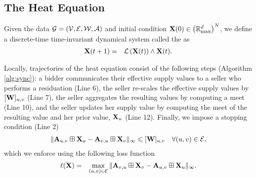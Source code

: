\documentclass[letterpaper, 10 pt, conference]{ieeeconf}
\begin{document}
\subsection{The Heat Equation}
\label{sec:heat}

Given the data $\mathcal{G} = (\mathcal{V},\mathcal{E},\mathcal{W},\mathcal{A})$ and initial condition $\mathbf{X}(0) \in \left(\mathbb{R}_{\mathrm{max}}^{d}\right)^N$, we define a discrete-time time-invariant dynamical system called the  as
\begin{align} 
    \mathbf{X}(t+1) &=& \mathcal{L} \left( \mathbf{X}(t) \right) \wedge \mathbf{X}(t). \label{eq:heat}
\end{align}

Locally, trajectories of the heat equation consist of the following steps (Algorithm \ref{alg:sync}): a bidder communicates their effective supply values to a seller who performs a residuation (Line 6), the seller re-scales the effective supply values by $[\mathbf{W}]_{u,v}$ (Line 7), the seller aggregates the resulting values by computing a meet (Line 10), and the seller updates her supply value by computing the meet of the resulting value and her prior value, $\mathbf{X}_u$ (Line 12).
Finally, we impose a stopping condition (Line 2) 
\begin{align}
        \| \mathbf{A}_{u,v} \boxplus \mathbf{X}_u - \mathbf{A}_{v,u} \boxplus \mathbf{X}_v \|_{\infty} \leqslant [\mathbf{W}]_{u,v} \quad \forall (u,v) \in \mathcal{E},
        \nonumber
    \end{align}
which we enforce using the following loss function
\begin{align}
    \ell(\mathbf{X}) &=& \max_{(u,v) \in \mathcal{E}} \| \mathbf{A}_{v,u} \boxplus \mathbf{X}_v - \mathbf{A}_{u,v} \boxplus \mathbf{X}_u \|_{\infty}. \label{eq:loss}
\end{align}
\end{document}
